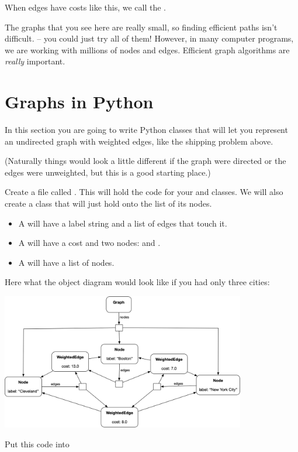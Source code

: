 When edges have costs like this,  we call the .

The graphs that you see here are really small, so finding efficient
paths isn't difficult. -- you could just try all of them! However, in
many computer programs, we are working with millions of nodes and
edges.  Efficient graph algorithms are \textit{really} important.

\section{Graphs in Python}

In this section you are going to write Python classes that will let
you represent an undirected graph with weighted edges, like the
shipping problem above.

(Naturally things would look a little different if the graph were
directed or the edges were unweighted, but this is a good starting
place.)

Create a file called .  This will hold the code for
your  and  classes.  We will also
create a  class that will just hold onto the list of
its nodes.

\begin{itemize}
\item A  will have a label string and a list of edges that touch it.
\item A  will have a cost and two nodes:  and .
\item A  will have a list of nodes.
\end{itemize}

Here what the object diagram would look like if you had only three cities:

\includegraphics[width=0.8\textwidth]{objdiagram.png}

Put this code into 


